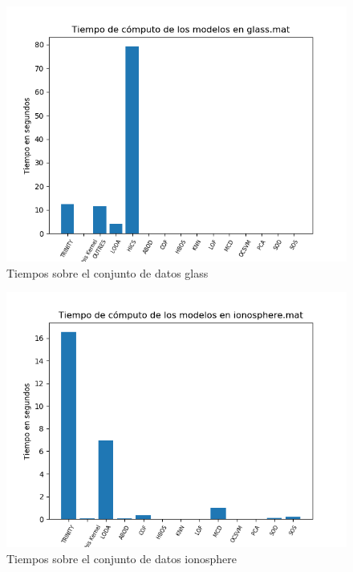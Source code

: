 \begin{figure}[H]
	\centering
	\includegraphics[scale=0.7]{imagenes/imgs-exp1/times/glass}
	\caption{Tiempos sobre el conjunto de datos glass}
	\label{glass_times}
\end{figure}

\begin{figure}[H]
	\centering
	\includegraphics[scale=0.7]{imagenes/imgs-exp1/times/ionosphere}
	\caption{Tiempos sobre el conjunto de datos ionosphere}
	\label{ionosphere_times}
\end{figure}


